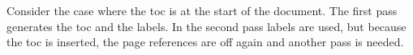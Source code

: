 Consider the case where the toc is at the start of the document.
The first pass generates the toc and the labels. In the second pass
labels are used, but because the toc is inserted, the page references
are off again and another pass is needed.
